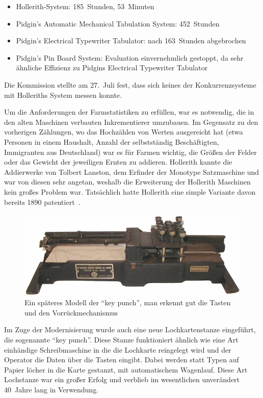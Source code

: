 \documentclass[parskip=half]{scrartcl}
\begin{document}
\begin{itemize}
  \item Hollerith-System: 185~Stunden, 53~Minuten
  \item Pidgin's Automatic Mechanical Tabulation System: 452~Stunden
  \item Pidgin's Electrical Typewriter Tabulator: nach 163~Stunden abgebrochen
  \item Pidgin's Pin Board System: Evaluation einvernehmlich gestoppt, da sehr
    ähnliche Effizienz zu Pidgins Electrical Typewriter Tabulator
\end{itemize}

Die Kommission stellte am 27.~Juli fest, dass sich keines der Konkurrenzsysteme
mit Holleriths System messen konnte.

Um die Anforderungen der Farmstatistiken zu erfüllen, war es notwendig, die in
den alten Maschinen verbauten Inkrementierer umzubauen. Im
Gegensatz zu den vorherigen Zählungen, wo das Hochzählen von Werten ausgereicht
hat (etwa Personen in einem Haushalt, Anzahl der selbstständig Beschäftigten,
Immigranten aus Deutschland) war es für Farmen wichtig, die Größen der Felder
oder das Gewicht der jeweiligen Ernten zu addieren. Hollerith kannte die
Addierwerke von Tolbert Lanston, dem Erfinder der Monotype Satzmaschine und war
von diesen sehr angetan, weshalb die Erweiterung der Hollerith Maschinen kein
großes Problem war. Tatsächlich hatte Hollerith eine simple Variante davon bereits
1890 patentiert~\cite{truesdell1965development}.

\begin{figure}[h]
  \centering
  \includegraphics[width=\textwidth]{keypunch}
  \caption{Ein späteres Modell der \enquote{key punch}, man erkennt gut die
    Tasten und den Vorrückmechanismus~\cite{keypunch}}
  \label{fig:keypunch}
\end{figure}

Im Zuge der Modernisierung wurde auch eine neue Lochkartenstanze eingeführt,
die sogenannte \enquote{key punch}. Diese Stanze funktioniert ähnlich wie eine
Art einhändige Schreibmaschine in die die Lochkarte reingelegt wird und der
Operator die Daten über die Tasten eingibt. Dabei werden statt Typen auf Papier
löcher in die Karte gestanzt, mit automatischem Wagenlauf. Diese Art Lochstanze
war ein großer Erfolg und verblieb im wesentlichen unverändert 40~Jahre lang in
Verwendung.
\end{document}
